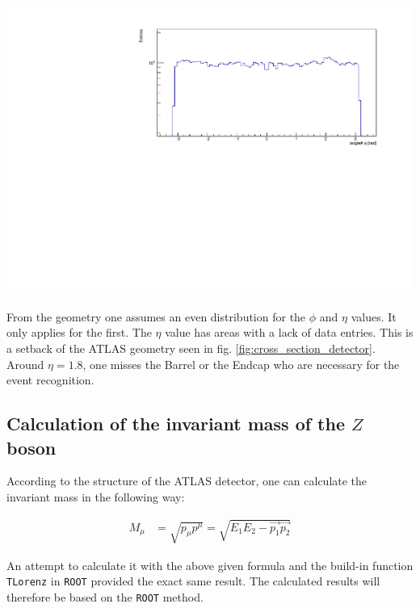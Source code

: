 \documentclass[12pt, a4paper, bibliography=totoc]{scrartcl}
\begin{document}
\begin{multicols}{2}
\begin{center}
    \includegraphics[width=\linewidth]{fig/phi_final.pdf}
\end{center}
From the geometry one assumes an even distribution for the $\phi$ and $\eta$ values.
It only applies for the first. The $\eta$ value has areas with a lack of data entries. This is a setback of the ATLAS geometry seen in fig. \ref{fig:cross_section_detector}. Around $\eta = 1.8$, one misses the Barrel or the Endcap who are necessary for the event recognition. 

\subsection{Calculation of the invariant mass of the $Z$ boson}
According to the structure of the ATLAS detector, one can calculate the invariant mass in the following way:

\begin{align}
	M_{\mu} &= \sqrt{p_{\mu}p^{\mu}} = \sqrt{E_{1}E_{2}-\vec{p_{1}}\vec{p_{2}}}%
\end{align}


An attempt to calculate it with the above given formula and the build-in function \verb*+TLorenz+ in \verb*+ROOT+ provided the exact same result. 
The calculated results will therefore be based on the \verb*+ROOT+ method.



\end{multicols}
\end{document}
